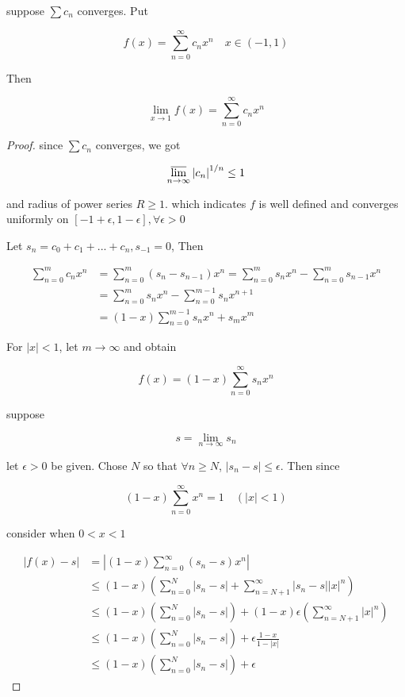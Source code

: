 \begin{thm}
    suppose $\sum c_n$ converges. Put

    \[
        f(x) = \sum_{n=0}^{\infty}c_n x^n \quad x \in (-1,1)
    \]

    Then

    \[
        \lim_{x \to 1}f(x) = \sum_{n=0}^{\infty}c_n x^n
    \]
\end{thm}

\begin{proof}
    since $\sum c_n$ converges, we got

    \[
        \varlimsup_{n \to \infty}\left| c_n \right|^{1/n} \le 1
    \]

    and radius of power series $R \ge 1$. which indicates $f$ is well defined and converges uniformly on $[-1 + \epsilon, 1-\epsilon], \forall \epsilon >0$

    Let $s_n = c_0 + c_1 + ... + c_n, s_{-1} = 0$, Then

    \begin{align*}
        \sum_{n=0}^{m} c_n x^n &= \sum_{n=0}^{m} (s_n -s_{n-1}) x^n = \sum_{n=0}^{m} s_n  x^n -  \sum_{n=0}^{m} s_{n-1}  x^n \\
        &= \sum_{n=0}^{m} s_n  x^n -  \sum_{n=0}^{m-1} s_n  x^{n+1} \\
        &= (1-x)\sum_{n=0}^{m-1} s_n  x^n + s_mx^m
    \end{align*}

    For $|x| < 1$, let $m \to \infty$ and obtain

    \[
        f(x) = (1-x)\sum_{n=0}^{\infty}s_nx^n
    \]

    suppose 
    
    \[
    s = \lim_{n \to \infty}s_n
    \]

    let $\epsilon > 0$ be given. Chose $N$ so that $\forall n \ge N$, 
    $|s_n -s| \le \epsilon$. Then since

    \[
        (1-x)\sum_{n=0}^{\infty} x^n = 1 \quad (|x| < 1)
    \]

    consider when $0 < x < 1$

    \begin{align*}
        \left| f(x) -s \right| &= \left| (1-x)\sum_{n=0}^{\infty}(s_n-s) x^n  \right| \\
        & \le (1-x) \left( \sum_{n=0}^{N} \left| s_n -s \right|   + \sum_{n=N+1}^{\infty} \left| s_n -s \right| |x|^n \right) \\
        & \le (1-x) \left( \sum_{n=0}^{N} \left| s_n -s \right|  \right) + (1-x)\epsilon \left(\sum_{n=N+1}^{\infty}  |x|^n  \right) \\
        & \le (1-x) \left( \sum_{n=0}^{N} \left| s_n -s \right| \right) + \epsilon \frac{1-x}{1- |x|} \\
        & \le (1-x) \left( \sum_{n=0}^{N} \left| s_n -s \right| \right) + \epsilon 
    \end{align*}


\end{proof}
